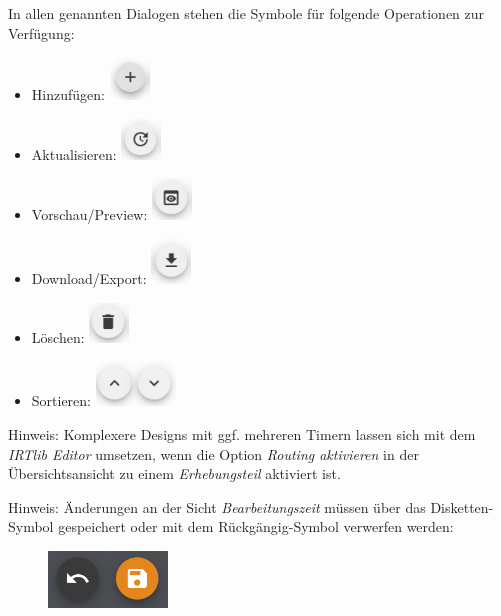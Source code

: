 \documentclass[
  letterpaper,
  DIV=11]{scrreprt}
\providecommand{\tightlist}{%
  \setlength{\itemsep}{0pt}\setlength{\parskip}{0pt}}\usepackage{longtable,booktabs,array}
\begin{document}
\begin{tcolorbox}
In allen genannten Dialogen stehen die Symbole für folgende Operationen
zur Verfügung:

\begin{itemize}
\tightlist
\item
  Hinzufügen:
  \includegraphics[width=0.41667in,height=\textheight]{img/screenshot-add-project-plus-icon.png}
\item
  Aktualisieren:
  \includegraphics[width=0.41667in,height=\textheight]{img/screenshot-update-item-icon-01.png}
\item
  Vorschau/Preview:
  \includegraphics[width=0.41667in,height=\textheight]{img/screenshot-preview-icon-01.png}
\item
  Download/Export:
  \includegraphics[width=0.41667in,height=\textheight]{img/screenshot-download-item-icon-01.png}
\item
  Löschen:
  \includegraphics[width=0.41667in,height=\textheight]{img/screenshot-delete-item-icon-01.png}
\item
  Sortieren:
  \includegraphics[width=0.83333in,height=\textheight]{img/screenshot-sort-items-icon-01.png}
\end{itemize}

Hinweis: Komplexere Designs mit ggf. mehreren Timern lassen sich mit dem
\emph{IRTlib Editor} umsetzen, wenn die Option \emph{Routing aktivieren}
in der Übersichtsansicht zu einem \emph{Erhebungsteil} aktiviert ist.

Hinweis: Änderungen an der Sicht \emph{Bearbeitungszeit} müssen über das
Disketten-Symbol gespeichert oder mit dem Rückgängig-Symbol verwerfen
werden:

\begin{figure}[H]

\includegraphics[width=1.25in,height=\textheight]{img/screenshot-icons-undo-and-save-01.png} \hfill{}

\end{figure}

\end{tcolorbox}
\end{document}
